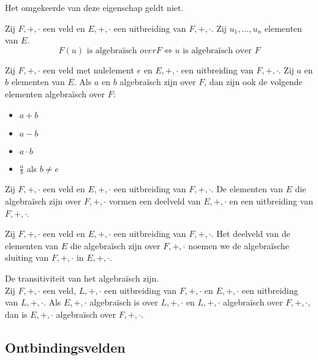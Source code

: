 \documentclass[main.tex]{subfiles}
\begin{document}
\begin{opm}
  Het omgekeerde van deze eigenschap geldt niet.
\end{opm}

\begin{st}
  Zij $F,+,\cdot$ een veld en $E,+,\cdot$ een uitbreiding van $F,+,\cdot$.
  Zij $u_{1},\dotsc,u_{n}$ elementen van $E$.
  \[ F(u) \text{ is algebra\"isch } over F \Leftrightarrow u \text{ is algebra\"isch over } F \]
\end{st}

\begin{st}
  Zij $F,+,\cdot$ een veld met nulelement $e$ en $E,+,\cdot$ een uitbreiding van $F,+,\cdot$.
  Zij $a$ en $b$ elementen van $E$.
  Als $a$ en $b$ algebra\"isch zijn over $F$, dan zijn ook de volgende elementen algebra\"isch over $F$:
  \begin{itemize}
  \item $a+b$
  \item $a-b$
  \item $a\cdot b$
  \item $\frac{a}{b}$ als $b \neq e$
  \end{itemize}
\end{st}

\begin{gev}
  Zij $F,+,\cdot$ een veld en $E,+,\cdot$ een uitbreiding van $F,+,\cdot$.
  De elementen van $E$ die algebra\"isch zijn over $F,+,\cdot$ vormen een deelveld van $E,+,\cdot$ en een uitbreiding van $F,+,\cdot$.
\end{gev}

\begin{de}
  Zij $F,+,\cdot$ een veld en $E,+,\cdot$ een uitbreiding van $F,+,\cdot$.
  Het deelveld van de elementen van $E$ die algebra\"isch zijn over $F,+,\cdot$ noemen we de algebra\"ische sluiting van $F,+,\cdot$ in $E,+,\cdot$.
\end{de}

\begin{st}
  De transitiviteit van het algebra\"isch zijn.\\
  Zij $F,+,\cdot$ een veld, $L,+,\cdot$ een uitbreiding van $F,+,\cdot$ en $E,+,\cdot$ een uitbreiding van $L,+,\cdot$.
  Als $E,+,\cdot$ algebra\"isch is over $L,+,\cdot$ en $L,+,\cdot$ algebra\"isch over $F,+,\cdot$, dan is $E,+,\cdot$ algebra\"isch over $F,+,\cdot$.
\end{st}

\subsection{Ontbindingsvelden}
\label{sec:ontbindingsvelden}
\end{document}
